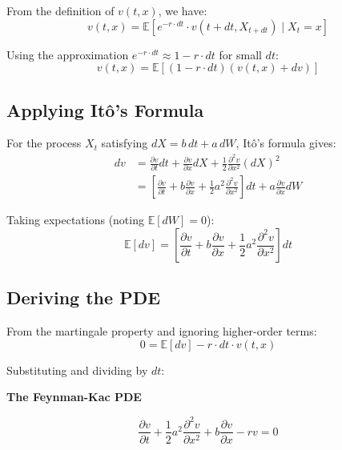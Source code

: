\documentclass[11pt,a4paper]{article}
\newenvironment{keybox}[1][Key Result]
{\begin{leftbar}\noindent\textbf{\color{theoremblue}#1}\par\vspace{0.5em}}
{\end{leftbar}}
\begin{document}
From the definition of $v(t,x)$, we have:
\begin{equation}
v(t,x) = \mathbb{E}\left[e^{-r \cdot dt} \cdot v(t+dt, X_{t+dt}) \mid X_t = x\right]
\end{equation}

Using the approximation $e^{-r \cdot dt} \approx 1 - r \cdot dt$ for small $dt$:
\begin{equation}
v(t,x) = \mathbb{E}[(1 - r \cdot dt)(v(t,x) + dv)]
\end{equation}

\subsection{Applying Itô's Formula}

For the process $X_t$ satisfying $dX = b\,dt + a\,dW$, Itô's formula gives:
\begin{align}
dv &= \frac{\partial v}{\partial t}dt + \frac{\partial v}{\partial x}dX + \frac{1}{2}\frac{\partial^2 v}{\partial x^2}(dX)^2\\
&= \left[\frac{\partial v}{\partial t} + b\frac{\partial v}{\partial x} + \frac{1}{2}a^2\frac{\partial^2 v}{\partial x^2}\right]dt + a\frac{\partial v}{\partial x}dW
\end{align}

Taking expectations (noting $\mathbb{E}[dW] = 0$):
\begin{equation}
\mathbb{E}[dv] = \left[\frac{\partial v}{\partial t} + b\frac{\partial v}{\partial x} + \frac{1}{2}a^2\frac{\partial^2 v}{\partial x^2}\right]dt
\end{equation}

\subsection{Deriving the PDE}

From the martingale property and ignoring higher-order terms:
\begin{equation}
0 = \mathbb{E}[dv] - r \cdot dt \cdot v(t,x)
\end{equation}

Substituting and dividing by $dt$:
\begin{keybox}[The Feynman-Kac PDE]
\begin{equation}
\frac{\partial v}{\partial t} + \frac{1}{2}a^2\frac{\partial^2 v}{\partial x^2} + b\frac{\partial v}{\partial x} - rv = 0
\end{equation}
\end{keybox}
\end{document}
